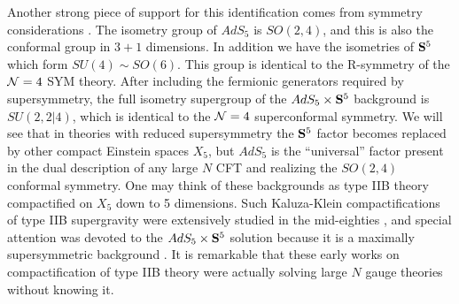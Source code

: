 \documentclass[12pt]{article}
\begin{document}
Another strong piece of support for this identification comes from
symmetry considerations \cite{jthroat}. The isometry group of
$AdS_5$ is $SO(2,4)$, and this is also the conformal group in
$3+1$ dimensions. In addition we have the isometries of ${\bf S}^5$ which
form $SU(4)\sim SO(6)$. This group is identical to the R-symmetry of
the ${\cal N}=4$ SYM theory. After including the fermionic generators
required by supersymmetry, the full isometry supergroup of the
$AdS_5\times {\bf S}^5$ background is $SU(2,2|4)$, which is identical to
the ${\cal N}=4$ superconformal symmetry.
We will see that in theories with reduced supersymmetry
the ${\bf S}^5$ factor becomes replaced by other
compact Einstein spaces $X_5$,
but $AdS_5$ is the ``universal'' factor present in the dual
description of any large $N$ CFT and realizing the $SO(2,4)$ conformal
symmetry. One may think of these backgrounds as type IIB theory
compactified on $X_5$ down to 5 dimensions. Such Kaluza-Klein
compactifications of type IIB supergravity were extensively studied in the
mid-eighties \cite{GRW,Romans,Duff}, and special attention was devoted to
the $AdS_5\times {\bf S}^5$ solution because it is
a maximally supersymmetric background \cite{SH,Kim}.
It is remarkable that these early works on compactification
of type IIB theory
were actually solving large $N$ gauge theories without knowing it.
\end{document}
